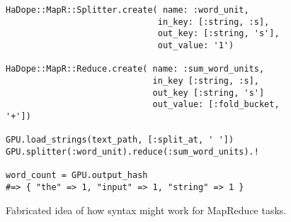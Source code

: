 \begin{figure*}
\begin{lstlisting}
HaDope::MapR::Splitter.create( name: :word_unit,
                              in_key: [:string, :s],
                              out_key: [:string, 's'],
                              out_value: '1')
 
HaDope::MapR::Reduce.create( name: :sum_word_units,
                             in_key [:string, :s],
                             out_key [:string, 's']
                             out_value: [:fold_bucket, '+'])
 
GPU.load_strings(text_path, [:split_at, ' '])
GPU.splitter(:word_unit).reduce(:sum_word_units).!
 
word_count = GPU.output_hash
#=> { "the" => 1, "input" => 1, "string" => 1 }
\end{lstlisting}
\caption{Fabricated idea of how syntax might work for MapReduce tasks.}
\label{snippet}
\end{figure*}


